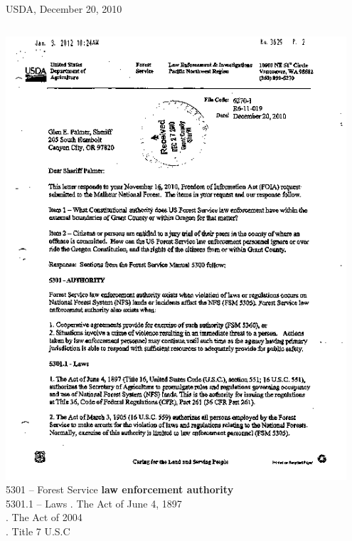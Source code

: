 \begin{frame}{USDA, December 20, 2010}
    \begin{columns}[onlytextwidth]
            \centering
            \includegraphics[width=0.95\textwidth]{img/usda-letter.png} \\

            5301 -- Forest Service \textbf{law enforcement authority} \\
            5301.1 -- Laws
            . The Act of June 4, 1897 \\
            . The Act of 2004 \\
            . Title 7 U.S.C \\
    \end{columns}
\end{frame}

